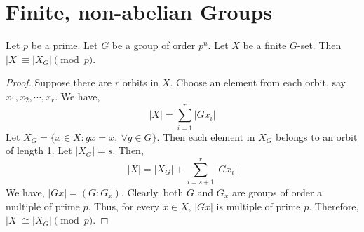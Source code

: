 \section{Finite, non-abelian Groups}
\begin{theorem}
	Let $p$ be a prime. Let $G$ be a group of order $p^n$.
	Let $X$ be a finite $G$-set.
	Then $|X| \equiv |X_G| \pmod{p}$.
\end{theorem}
\begin{proof}
	Suppose there are $r$ orbits in $X$.
	Choose an element from each orbit, say $x_1,x_2,\cdots,x_r$.
	We have, 
	\begin{equation}
		|X| = \sum_{i = 1}^r |Gx_i|
	\end{equation}
	Let $X_G = \{ x \in X : gx = x,\ \forall g \in G \}$.
	Then each element in $X_G$ belongs to an orbit of length 1.
	Let $|X_G| = s$. Then,
	\begin{equation}
		|X| = |X_G| + \sum_{i = s+1}^r |Gx_i|
	\end{equation}
	We have, $|Gx| = (G:G_x)$.
	Clearly, both $G$ and $G_x$ are groups of order a multiple of prime $p$.
	Thus, for every $x \in X$, $|Gx|$ is multiple of prime $p$.
	Therefore, $|X| \cong |X_G| \pmod{p}$.
\end{proof}

